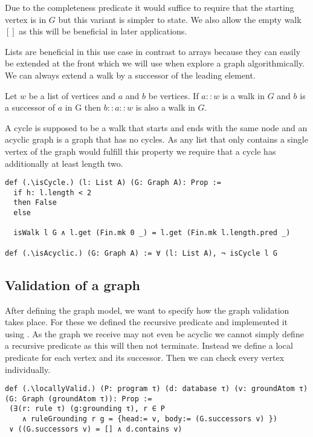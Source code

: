 Due to the completeness predicate it would suffice to require that the starting vertex is in $G$ but this variant is simpler to state. We also allow the empty walk $[]$ as this will be beneficial in later applications.

Lists are beneficial in this use case in contrast to arrays because they can easily be extended at the front which we will use when explore a graph algorithmically. We can always extend a walk by a successor of the leading element.

\begin{lemma}[\isWalkextendssuccessors]
    Let $w$ be a list of vertices and $a$ and $b$ be vertices.
    If $a::w$ is a walk in $G$ and $b$ is a successor of $a$ in G then $b::a::w$ is also a walk in $G$.
\end{lemma}

A cycle is supposed to be a walk that starts and ends with the same node and an acyclic graph is a graph that has no cycles. As any list that only contains a single vertex of the graph would fulfill this property we require that a cycle has additionally at least length two.

\begin{lstlisting}
def (.\isCycle.) (l: List A) (G: Graph A): Prop :=
  if h: l.length < 2
  then False
  else

  isWalk l G ∧ l.get (Fin.mk 0 _) = l.get (Fin.mk l.length.pred _)

def (.\isAcyclic.) (G: Graph A) := ∀ (l: List A), ¬ isCycle l G
\end{lstlisting}

\subsection{Validation of a graph}

After defining the graph model, we want to specify how the graph validation takes place. For these we defined the recursive predicate \isValid and implemented it using \treeValidator. As the graph we receive may not even be acyclic we cannot simply define a recursive predicate as this will then not terminate. Instead we define a local predicate for each vertex and its successor. Then we can check every vertex individually.

\begin{lstlisting}
def (.\locallyValid.) (P: program τ) (d: database τ) (v: groundAtom τ) (G: Graph (groundAtom τ)): Prop :=
 (∃(r: rule τ) (g:grounding τ), r ∈ P 
    ∧ ruleGrounding r g = {head:= v, body:= (G.successors v) }) 
 ∨ ((G.successors v) = [] ∧ d.contains v)
\end{lstlisting}

